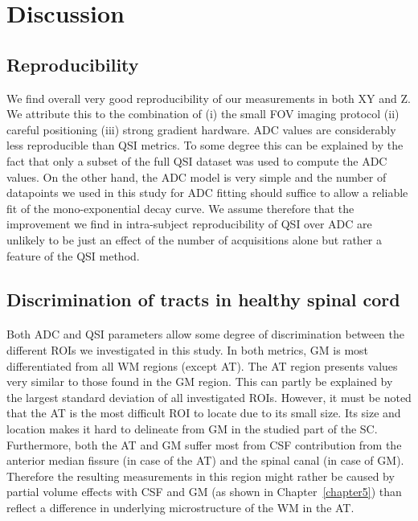 \section{Discussion}
\subsection{Reproducibility}
 We find overall very good reproducibility of our measurements in both XY and Z. We attribute this to the combination of (i) the small FOV imaging protocol (ii) careful positioning  (iii) strong gradient hardware. ADC values are considerably less reproducible than QSI metrics. To some degree this can be explained by the fact that only a subset of the full QSI dataset was used to compute the ADC values. On the other hand, the ADC model is very simple and the number of datapoints we used in this study for ADC fitting should suffice to allow a reliable fit of the mono-exponential decay curve. We assume therefore that the improvement we find in intra-subject reproducibility of QSI over ADC are unlikely to be just an effect of the number of acquisitions alone but rather a feature of the QSI method.

\subsection{Discrimination of tracts in healthy spinal cord}
\paragraph{} Both ADC and QSI parameters allow some degree of discrimination between the different \glspl{ROI} we investigated in this study. In both metrics, GM is most differentiated from all WM regions (except AT). The AT region presents values very similar to those found in the GM region. This can partly be explained by the largest standard deviation of all investigated \glspl{ROI}. However, it must be noted that the AT is the most difficult \gls{ROI} to locate due to its small size. Its size and location makes it hard to delineate from GM in the studied part of the \gls{SC}. Furthermore, both the AT and GM suffer most from \gls{CSF} contribution from the anterior median fissure (in case of the AT) and the spinal canal (in case of GM). Therefore the resulting measurements in this region might rather be caused by partial volume effects with \gls{CSF} and GM (as shown in Chapter~\ref{chapter5}) than reflect a difference in underlying microstructure of the WM in the AT.


